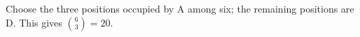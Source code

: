 Choose the three positions occupied by A among six; the remaining positions are D. This gives $\binom63=\boxed{20}$.
